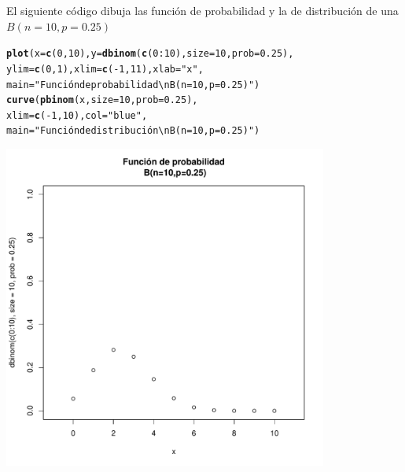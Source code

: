\documentclass[handout]{beamer}\usepackage[]{graphicx}\usepackage[]{color}
\makeatletter
\newcommand{\hlnum}[1]{\textcolor[rgb]{0.686,0.059,0.569}{#1}}%
\newcommand{\hlstr}[1]{\textcolor[rgb]{0.192,0.494,0.8}{#1}}%
\newcommand{\hlopt}[1]{\textcolor[rgb]{0,0,0}{#1}}%
\newcommand{\hlstd}[1]{\textcolor[rgb]{0.345,0.345,0.345}{#1}}%
\newcommand{\hlkwc}[1]{\textcolor[rgb]{0.333,0.667,0.333}{#1}}%
\newcommand{\hlkwd}[1]{\textcolor[rgb]{0.737,0.353,0.396}{\textbf{#1}}}%
\newenvironment{kframe}{%
 \def\at@end@of@kframe{}%
 \ifinner\ifhmode%
  \def\at@end@of@kframe{\end{minipage}}%
  \begin{minipage}{\columnwidth}%
 \fi\fi%
 \def\FrameCommand##1{\hskip\@totalleftmargin \hskip-\fboxsep
 \colorbox{shadecolor}{##1}\hskip-\fboxsep
     \hskip-\linewidth \hskip-\@totalleftmargin \hskip\columnwidth}%
 \MakeFramed {\advance\hsize-\width
   \@totalleftmargin\z@ \linewidth\hsize
   \@setminipage}}%
 {\par\unskip\endMakeFramed%
 \at@end@of@kframe}
\newenvironment{knitrout}{}{} %
\theoremstyle{plain}
\theoremstyle{definition}
\makeatother
\begin{document}

\begin{frame}[fragile]

El siguiente código dibuja las función de probabilidad y la de distribución de una  $B(n=10,p=0.25)$

\begin{knitrout}
\color{fgcolor}\begin{kframe}
\begin{alltt}
\hlkwd{plot}\hlstd{(}\hlkwc{x}\hlstd{=}\hlkwd{c}\hlstd{(}\hlnum{0}\hlstd{,}\hlnum{10}\hlstd{),}\hlkwc{y}\hlstd{=}\hlkwd{dbinom}\hlstd{(}\hlkwd{c}\hlstd{(}\hlnum{0}\hlopt{:}\hlnum{10}\hlstd{),}\hlkwc{size}\hlstd{=}\hlnum{10}\hlstd{,}\hlkwc{prob}\hlstd{=}\hlnum{0.25}\hlstd{),}
  \hlkwc{ylim}\hlstd{=}\hlkwd{c}\hlstd{(}\hlnum{0}\hlstd{,}\hlnum{1}\hlstd{),}\hlkwc{xlim}\hlstd{=}\hlkwd{c}\hlstd{(}\hlopt{-}\hlnum{1}\hlstd{,}\hlnum{11}\hlstd{),}\hlkwc{xlab}\hlstd{=}\hlstr{"x"}\hlstd{,}
  \hlkwc{main}\hlstd{=}\hlstr{"Función de probabilidad\textbackslash{}n B(n=10,p=0.25)"}\hlstd{)}
\hlkwd{curve}\hlstd{(}\hlkwd{pbinom}\hlstd{(x,}\hlkwc{size}\hlstd{=}\hlnum{10}\hlstd{,}\hlkwc{prob}\hlstd{=}\hlnum{0.25}\hlstd{),}
  \hlkwc{xlim}\hlstd{=}\hlkwd{c}\hlstd{(}\hlopt{-}\hlnum{1}\hlstd{,}\hlnum{10}\hlstd{),}\hlkwc{col}\hlstd{=}\hlstr{"blue"}\hlstd{,}
  \hlkwc{main}\hlstd{=}\hlstr{"Función de distribución\textbackslash{}n B(n=10,p=0.25)"}\hlstd{)}
\end{alltt}
\end{kframe}
\end{knitrout}

\end{frame}


\begin{frame}[fragile]

\begin{knitrout}
\color{fgcolor}
\includegraphics[width=0.8\textwidth]{figure/unnamed-chunk-5-1} 

\end{knitrout}

\end{frame}
\end{document}
